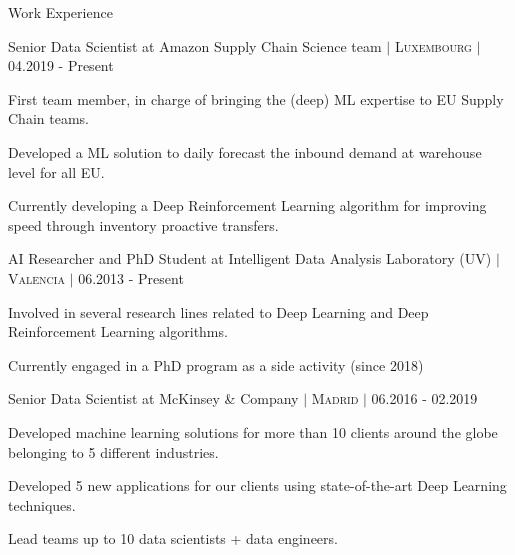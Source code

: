 \documentclass{resume} %
\begin{document}
\begin{rSection}{Work Experience} \itemsep -1pt
\begin{rSubsection}{Senior Data Scientist at Amazon Supply Chain Science team  $|$  \textnormal{\textsc{Luxembourg}} $|$ \textnormal{04.2019 - Present}}{}{}

	\vspace{-3pt}

	\item First team member, in charge of bringing the (deep) ML expertise to EU Supply Chain teams.
	\item Developed a ML solution to daily forecast the inbound demand at warehouse level for all EU.
	\item Currently developing a Deep Reinforcement Learning algorithm for improving speed through inventory proactive transfers.
\end{rSubsection}


\vspace{-6pt}

\begin{rSubsection}{AI Researcher and PhD Student at Intelligent Data Analysis Laboratory (UV)  $|$  \textnormal{\textsc{Valencia}} $|$ \textnormal{06.2013 - Present}}{}{}

	\vspace{-3pt}

	\item Involved in several research lines related to Deep Learning and Deep Reinforcement Learning algorithms.
	\item Currently engaged in a PhD program as a side activity (since 2018)

\end{rSubsection}

\vspace{-6pt}

\begin{rSubsection}{Senior Data Scientist at McKinsey \& Company  $|$ \textnormal{\textsc{Madrid}} $|$ \textnormal{06.2016 - 02.2019}}{}{}

    \vspace{-3pt}

    \item Developed machine learning solutions for more than 10 clients around the globe belonging to 5 different industries.
    \item Developed 5 new applications for our clients using state-of-the-art Deep Learning techniques.
    \item Lead teams up to 10 data scientists + data engineers.
\end{rSubsection}


\end{rSection}
\end{document}
